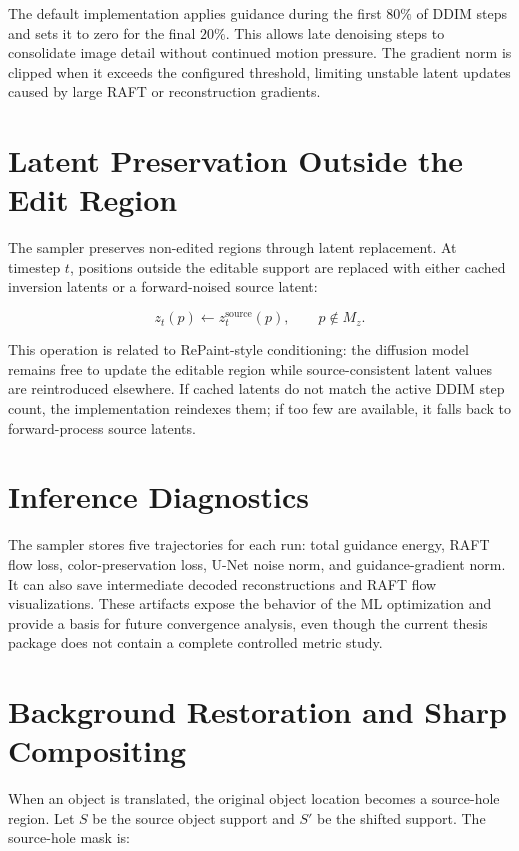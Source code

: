 The default implementation applies guidance during the first $80\%$ of DDIM steps and sets it to zero for the final $20\%$. This allows late denoising steps to consolidate image detail without continued motion pressure. The gradient norm is clipped when it exceeds the configured threshold, limiting unstable latent updates caused by large RAFT or reconstruction gradients.

\section{Latent Preservation Outside the Edit Region}

The sampler preserves non-edited regions through latent replacement. At timestep $t$, positions outside the editable support are replaced with either cached inversion latents or a forward-noised source latent:

\begin{equation}
z_t(p) \leftarrow z_t^{\mathrm{source}}(p), \qquad p\notin M_z.
\label{eq:latent-replacement}
\end{equation}

This operation is related to RePaint-style conditioning: the diffusion model remains free to update the editable region while source-consistent latent values are reintroduced elsewhere. If cached latents do not match the active DDIM step count, the implementation reindexes them; if too few are available, it falls back to forward-process source latents.

\section{Inference Diagnostics}

The sampler stores five trajectories for each run: total guidance energy, RAFT flow loss, color-preservation loss, U-Net noise norm, and guidance-gradient norm. It can also save intermediate decoded reconstructions and RAFT flow visualizations. These artifacts expose the behavior of the ML optimization and provide a basis for future convergence analysis, even though the current thesis package does not contain a complete controlled metric study.

\section{Background Restoration and Sharp Compositing}

When an object is translated, the original object location becomes a source-hole region. Let $S$ be the source object support and $S'$ be the shifted support. The source-hole mask is:


